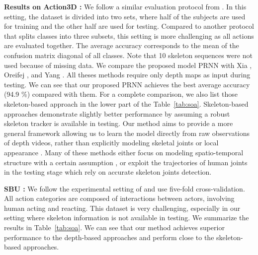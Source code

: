 \documentclass[10pt,twocolumn,letterpaper]{article}
\begin{document}
\noindent \textbf{Results on Action3D :} We follow a similar evaluation protocol from \cite{Chunyu_aaai_2016,Wang_2016_CVPR}. In this setting, the dataset is divided into two sets, where half of the subjects are used for training and the other half are used for testing. Compared to another protocol \cite{Yong_cvpr_2015} that splits classes into three subsets, this setting is more challenging as all actions are evaluated together. 
The average accuracy corresponds to the mean of the confusion matrix diagonal of all classes. Note that 10 skeleton sequences were not used \cite{Jiang_tpami_2014} because of missing data. We compare the proposed model PRNN with Xia \etal \cite{Lu_cvpr_2013}, Oreifej \etal \cite{Omar_cvpr_2013}, and Yang \etal \cite{Xiaodong_2014_cvpr}. All theses methods require only depth maps as input during testing. We can see that our proposed PRNN achieves the best average accuracy (94.9 \%) compared with them. For a complete comparison, we also list those skeleton-based approach in the lower part of the Table~\ref{tab:soa}. Skeleton-based approaches demonstrate slightly better performance by assuming a robust skeleton tracker is available in testing. Our method aims to provide a more general framework allowing us to learn the model directly from raw observations of depth videos, rather than explicitly modeling skeletal joints \cite{Yong_cvpr_2015} or local appearance \cite{Veeriah_2015_ICCV}. Many of these methods either focus on modeling spatio-temporal structure with a certain assumption \cite{Omar_cvpr_2013}, or exploit the trajectories of human joints \cite{Veeriah_2015_ICCV,Zanfir_2013_ICCV} in the testing stage which rely on accurate skeleton joints detection. 

\noindent \textbf{SBU :} We follow the experimental setting of \cite{kiwon_cvprw_2012,wentao_2016} and use five-fold cross-validation. All action categories are composed of interactions between actors, involving human acting and reacting. This dataset is very challenging, especially in our setting where skeleton information is not available in testing. We summarize the results in Table~\ref{tab:soa}. We can see that our method achieves superior performance to the depth-based approaches and perform close to the skeleton-based approaches. 
\end{document}
